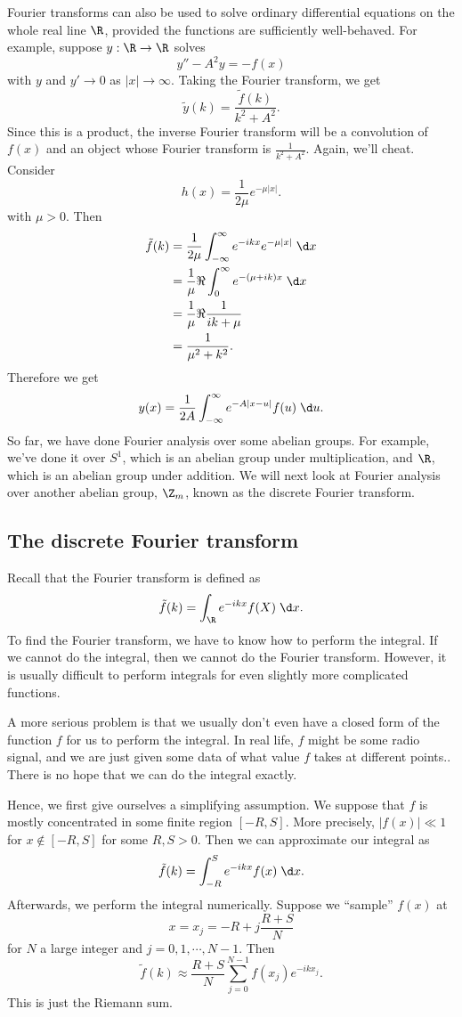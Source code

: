 \documentclass[a4paper]{article}
\begin{document}
Fourier transforms can also be used to solve ordinary differential equations on the whole real line $\R$, provided the functions are sufficiently well-behaved. For example, suppose $y: \R \to \R$ solves
\[
  y'' - A^2 y = -f(x)
\]
with $y$ and $y' \to 0$ as $|x| \to \infty$. Taking the Fourier transform, we get
\[
  \tilde{y}(k) = \frac{\tilde{f}(k)}{k^2 + A^2}.
\]
Since this is a product, the inverse Fourier transform will be a convolution of $f(x)$ and an object whose Fourier transform is $\frac{1}{k^2 + A^2}$. Again, we'll cheat. Consider
\[
  h(x) = \frac{1}{2\mu} e^{-\mu|x|}.
\]
with $\mu > 0$. Then
\begin{align*}
  \tilde{f}(k) &= \frac{1}{2\mu} \int_{-\infty}^\infty e^{-ikx} e^{-\mu |x|}\;\d x\\
  &= \frac{1}{\mu} \Re \int_0^\infty e^{-(\mu + ik)x}\;\d x \\
  &= \frac{1}{\mu} \Re \frac{1}{ik + \mu} \\
  &= \frac{1}{\mu^2 + k^2}.
\end{align*}
Therefore we get
\[
  y(x) = \frac{1}{2A} \int_{-\infty}^\infty e^{-A|x - u|} f(u)\;\d u.
\]
So far, we have done Fourier analysis over some abelian groups. For example, we've done it over $S^1$, which is an abelian group under multiplication, and $\R$, which is an abelian group under addition. We will next look at Fourier analysis over another abelian group, $\Z_m$, known as the discrete Fourier transform.

\subsection{The discrete Fourier transform}
Recall that the Fourier transform is defined as
\[
  \tilde{f}(k) = \int_\R e^{-ikx} f(X)\;\d x.
\]
To find the Fourier transform, we have to know how to perform the integral. If we cannot do the integral, then we cannot do the Fourier transform. However, it is usually difficult to perform integrals for even slightly more complicated functions.

A more serious problem is that we usually don't even have a closed form of the function $f$ for us to perform the integral. In real life, $f$ might be some radio signal, and we are just given some data of what value $f$ takes at different points.. There is no hope that we can do the integral exactly.

Hence, we first give ourselves a simplifying assumption. We suppose that $f$ is mostly concentrated in some finite region $[-R, S]$. More precisely, $|f(x)|\ll 1$ for $x \not\in [-R, S]$ for some $R, S > 0$. Then we can approximate our integral as
\[
  \tilde{f}(k) = \int_{-R}^S e^{-ikx} f(x)\;\d x.
\]
Afterwards, we perform the integral numerically. Suppose we ``sample'' $f(x)$ at
\[
  x = x_j = -R + j\frac{R + S}{N}
\]
for $N$ a large integer and $j = 0, 1, \cdots, N - 1$. Then
\[
  \tilde{f}(k) \approx \frac{R + S}{N} \sum_{j = 0}^{N - 1} f(x_j) e^{-ik x_j}.
\]
This is just the Riemann sum.
\end{document}
